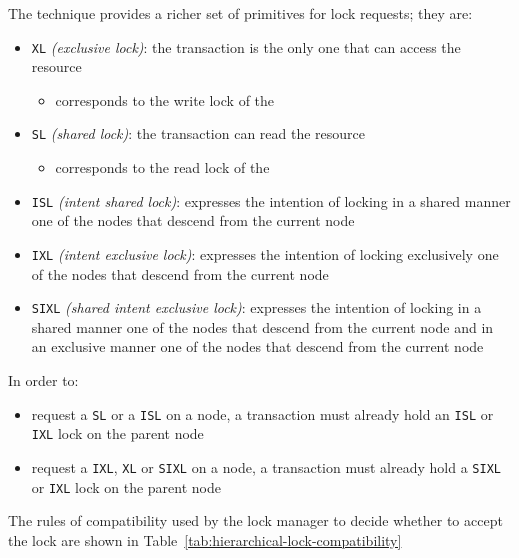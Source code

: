 \documentclass[english]{article}
\begin{document}
\bigskip
The technique provides a richer set of primitives for lock requests; they are:

\begin{itemize}
  \item \texttt{XL} \textit{(exclusive lock)}: the transaction is the only one that can access the resource
        \begin{itemize}[label=\(\rightarrow\)]
          \item corresponds to the write lock of the \tpl
        \end{itemize}
  \item \texttt{SL} \textit{(shared lock)}: the transaction can read the resource
        \begin{itemize}[label=\(\rightarrow\)]
          \item corresponds to the read lock of the \tpl
        \end{itemize}
  \item \texttt{ISL} \textit{(intent shared lock)}: expresses the intention of locking in a shared manner one of the nodes that descend from the current node
  \item \texttt{IXL} \textit{(intent exclusive lock)}: expresses the intention of locking exclusively one of the nodes that descend from the current node
  \item \texttt{SIXL} \textit{(shared intent exclusive lock)}: expresses the intention of locking in a shared manner one of the nodes that descend from the current node and in an exclusive manner one of the nodes that descend from the current node
\end{itemize}

In order to:

\begin{itemize}
  \item request a \texttt{SL} or a \texttt{ISL} on a node, a transaction must already hold an \texttt{ISL} or \texttt{IXL} lock on the parent node
  \item request a \texttt{IXL}, \texttt{XL} or \texttt{SIXL} on a node, a transaction must already hold a \texttt{SIXL} or \texttt{IXL} lock on the parent node
\end{itemize}

\bigskip
The rules of compatibility used by the lock manager to decide whether to accept the lock are shown in Table~\ref{tab:hierarchical-lock-compatibility}
\end{document}

